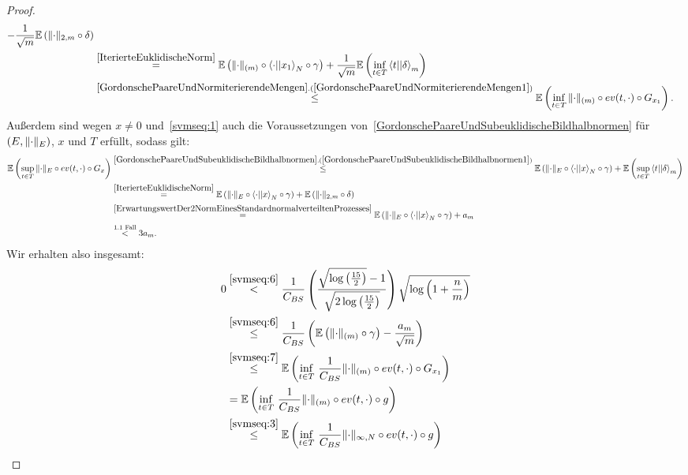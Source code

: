 \begin{proof}
\begin{align}
- \frac 1 {\sqrt m} \E\left(\norm\cdot_{2, m} \circ \delta \right)\notag\\
&\overset{\ref{IterierteEuklidischeNorm}}=
\E\left(\norm\cdot_{(m)} \circ \bprod \cdot {x_1}_N \circ\gamma \right)
+ \frac 1 {\sqrt m}\E\left(\inf_{t \in T} \bprod t \delta_m \right)\notag\\
&\overset{\refclaim{GordonschePaareUndNormiterierendeMengen}
{GordonschePaareUndNormiterierendeMengen1}}\le
\E\left(\inf_{t \in T}\, \norm\cdot_{(m)}\circ ev(t,\cdot)\circ G_{x_1} \right)
\text.\label{svmseq:7}
\end{align}
Außerdem sind wegen $x \neq 0$ und~\eqref{svmseq:1} auch die Voraussetzungen
von~\ref{GordonschePaareUndSubeuklidischeBildhalbnormen} für
$(E, \lVert\cdot\rVert_E)$, $x$ und $T$ erfüllt, sodass gilt:
\begin{align}
\E\left(\sup_{t \in T}\, \norm\cdot_{E}\circ ev(t,\cdot)\circ G_{x} \right)
&\overset{
\refclaim{GordonschePaareUndSubeuklidischeBildhalbnormen}
{GordonschePaareUndSubeuklidischeBildhalbnormen1}}
\le \E\left(\norm\cdot_E \circ \bprod \cdot x_N \circ \gamma \right)
+ \E\left(\sup_{t \in T} \bprod t \delta_m \right)\notag\\
&\overset{\ref{IterierteEuklidischeNorm}}=
\E\left(\norm\cdot_E \circ \bprod \cdot x_N \circ \gamma \right)
+ \E\left(\norm\cdot_{2, m}\circ \delta \right)\notag\\
&\overset{\ref{ErwartungswertDer2NormEinesStandardnormalverteiltenProzesses}}=
\E\left(\norm\cdot_E \circ \bprod \cdot x_N \circ \gamma \right) + a_m\notag\\
&\overset{\text{1.1 Fall}}< 3a_m \text.\label{svmseq:8}
\end{align}
Wir erhalten also insgesamt:
\begin{align*}
0 & \overset{\eqref{svmseq:6}}<
\frac 1 {C_{BS}}\left(\frac{\sqrt{\log\left(\frac {15}2 \right)} -1}
{\sqrt{2\log\left(\frac {15}2 \right)}} \right)
\sqrt{\log\left(1 + \frac {n}m \right)}\\
&\overset{\eqref{svmseq:6}}\le 
\frac 1 {C_{BS}}\left(\E\left(\norm \cdot_{(m)} \circ \gamma \right) 
- \frac {a_m}{\sqrt m}\right)\\
&\overset{\eqref{svmseq:7}}\le
\E\left(\inf_{t \in T}\, 
\frac 1 {C_{BS}}\norm\cdot_{(m)}\circ ev(t,\cdot)\circ G_{x_1} \right)\\
&=
\E\left(\inf_{t \in T}\, 
\frac 1 {C_{BS}}\norm\cdot_{(m)}\circ ev(t,\cdot)\circ g \right)\\
&\overset{\eqref{svmseq:3}}\le
\E\left(\inf_{t \in T}\, 
\frac 1 {C_{BS}}\norm\cdot_{\infty, N}\circ ev(t,\cdot)\circ g \right)\\

\end{align*}
\end{proof}
